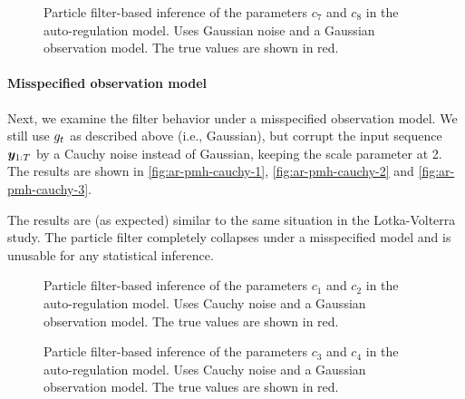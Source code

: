 \begin{figure}[htp]%
    \centering
    \qquad
    \caption{Particle filter-based inference of the parameters $c_7$ and $c_8$ in the auto-regulation model. Uses Gaussian noise and a Gaussian observation model. The true values are shown in red.}%
    \label{fig:ar-pmh-gauss-3}%
\end{figure}

\paragraph{Misspecified observation model}
Next, we examine the filter behavior under a misspecified observation model. We still use $g_t$ as described above (i.e., Gaussian), but corrupt the input sequence $\bm{y}_{1:T}$ by a Cauchy noise instead of Gaussian, keeping the scale parameter at 2. The results are shown in \autoref{fig:ar-pmh-cauchy-1}, \autoref{fig:ar-pmh-cauchy-2} and \autoref{fig:ar-pmh-cauchy-3}.

The results are (as expected) similar to the same situation in the Lotka-Volterra study. The particle filter completely collapses under a misspecified model and is unusable for any statistical inference.

\begin{figure}[htp]%
    \centering
    \qquad
    \caption{Particle filter-based inference of the parameters $c_1$ and $c_2$ in the auto-regulation model. Uses Cauchy noise and a Gaussian observation model. The true values are shown in red.}%
    \label{fig:ar-pmh-cauchy-1}%
\end{figure}

\begin{figure}[htp]%
    \centering
    \qquad
    \caption{Particle filter-based inference of the parameters $c_3$ and $c_4$ in the auto-regulation model. Uses Cauchy noise and a Gaussian observation model. The true values are shown in red.}%
    \label{fig:ar-pmh-cauchy-2}%
\end{figure}

